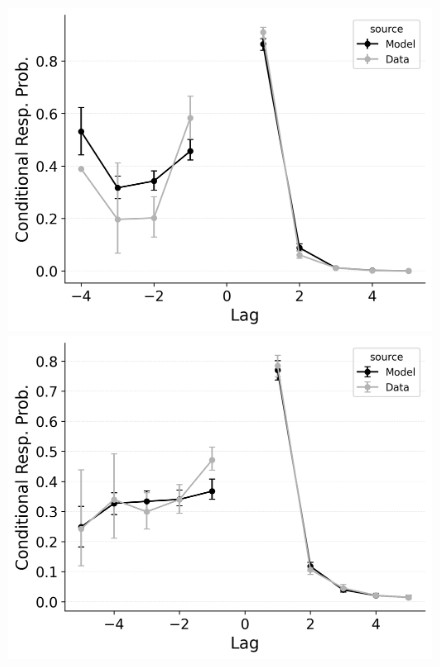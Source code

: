 \documentclass[
  man,
  floatsintext,
  longtable,
  nolmodern,
  notxfonts,
  notimes,
  draftfirst,
  colorlinks=true,linkcolor=blue,citecolor=blue,urlcolor=blue]{apa7}
\begin{document}
\begin{figure}
\begin{minipage}{0.33\linewidth}
\includegraphics{figures/bw_Gordon2021_BaseCMR_Confusable_Fitting_crp_LL5.png}\end{minipage}%
%
\begin{minipage}{0.33\linewidth}
\includegraphics{figures/bw_Gordon2021_BaseCMR_Confusable_Fitting_crp_LL6.png}\end{minipage}%
%
\begin{minipage}{0.33\linewidth}

\end{minipage}
\end{figure}
\end{document}
